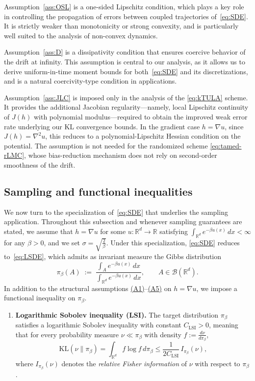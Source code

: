 \documentclass[11pt,a4paper,reqno]{amsart}
\theoremstyle{plain}
\theoremstyle{definition}
\theoremstyle{remark}
\newcommand{\R}{\mathbb{R}}
\newcommand{\KL}{\mathrm{KL}}
\begin{document}
Assumption~\ref{ass:OSL} is a one-sided Lipschitz condition, which plays a key role in controlling
the propagation of errors between coupled trajectories of~\eqref{eq:SDE}.
It is strictly weaker than monotonicity or strong convexity,
and is particularly well suited to the analysis of non-convex dynamics.

Assumption~\ref{ass:D} is a dissipativity condition that ensures coercive behavior of the drift
at infinity.
This assumption is central to our analysis, as it allows us to derive uniform-in-time
moment bounds for both~\eqref{eq:SDE} and its discretizations, and is a natural coercivity-type condition in applications.

Assumption~\ref{ass:JLC} is imposed only in the analysis of the \eqref{eq:kTULA}
scheme. It provides the additional Jacobian regularity---namely, local Lipschitz continuity of $J(h)$ with polynomial modulus---required to obtain the improved weak error rate underlying our KL convergence bounds. In the gradient case $h = \nabla u$, since $J(h) = \nabla^2 u$, this reduces to a polynomial-Lipschitz Hessian condition on the potential. The assumption is not needed for the randomized scheme \eqref{eq:tamed-rLMC}, whose
bias-reduction mechanism does not rely on second-order smoothness of the drift.


\subsection{Sampling and functional inequalities}
\label{subsec:functional-ineq}

We now turn to the specialization of~\eqref{eq:SDE} that underlies the sampling application. Throughout this subsection and whenever sampling guarantees are stated, we assume that $h = \nabla u$ for some $u : \R^d \to \R$ satisfying $\int_{\R^d} e^{-\beta u(x)}\,dx < \infty$ for any $\beta > 0$, and we set $\sigma = \sqrt{\frac{2}{\beta}}$. Under this specialization, \eqref{eq:SDE} reduces to~\eqref{eq:LSDE}, which admits as invariant measure the Gibbs distribution
\[
  \pi_\beta(A) \;:=\; \frac{\int_A e^{-\beta u(x)}\,dx}{\int_{\R^d} e^{-\beta u(x)}\,dx},
  \qquad A \in \mathcal{B}(\R^d).
\]
In addition to the structural assumptions \hyperref[ass:PJG]{(A1)}--\hyperref[ass:JLC]{(A5)} on $h = \nabla u$, we impose a functional inequality on $\pi_\beta$.


\begin{enumerate}[label=(A\arabic*), leftmargin=*, resume]
\item \textbf{Logarithmic Sobolev inequality (LSI).}\label{ass:LSI}
The target distribution $\pi_\beta$ satisfies a logarithmic Sobolev inequality with constant $C_{\mathrm{LSI}}>0$,
meaning that for every probability measure $\nu\ll\pi_\beta$ with density $f:=\frac{d\nu}{d\pi_\beta}$,
\begin{equation}
\tag{LSI}
\label{eq:LSI}
 \KL(\nu\|\pi_\beta)
 =
 \int_{\R^d} f\log f\,d\pi_\beta
 \le
 \frac{1}{2C_{\mathrm{LSI}}}\,I_{\pi_\beta}(\nu),
\end{equation}
\noindent where $I_{\pi_\beta}(\nu)$ denotes the \emph{relative Fisher information} of $\nu$ with respect to $\pi_\beta$.
\end{enumerate}
\end{document}
